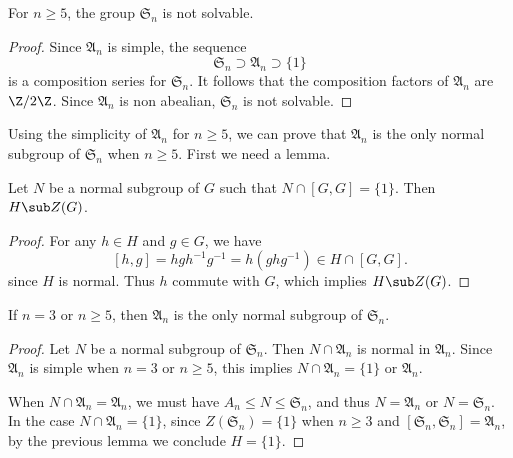 \begin{corollary}
For $n\geq 5$, the group $\mathfrak{S}_n$ is not solvable.
\end{corollary}
\begin{proof}
Since $\mathfrak{A}_n$ is simple, the sequence
\[\mathfrak{S}_n\supset\mathfrak{A}_n\supset\{1\}\]
is a composition series for $\mathfrak{S}_n$. It follows that the composition factors of $\mathfrak{A}_n$ are $\Z/2\Z$. Since $\mathfrak{A}_n$ is non abealian, $\mathfrak{S}_n$ is not solvable.
\end{proof}
Using the simplicity of $\mathfrak{A}_n$ for $n\geq 5$, we can prove that $\mathfrak{A}_n$ is the only normal subgroup of $\mathfrak{S}_n$ when $n\geq 5$. First we need a lemma.
\begin{lemma}
Let $N$ be a normal subgroup of $G$ such that $N\cap[G,G]=\{1\}$. Then $H\sub Z(G)$.
\end{lemma}
\begin{proof}
For any $h\in H$ and $g\in G$, we have
\[[h,g]=hgh^{-1}g^{-1}=h(ghg^{-1})\in H\cap[G,G].\]
since $H$ is normal. Thus $h$ commute with $G$, which implies $H\sub Z(G)$.
\end{proof}
\begin{proposition}
If $n=3$ or $n\geq 5$, then $\mathfrak{A}_n$ is the only normal subgroup of $\mathfrak{S}_n$.
\end{proposition}
\begin{proof}
Let $N$ be a normal subgroup of $\mathfrak{S}_n$. Then $N\cap\mathfrak{A}_n$ is normal in $\mathfrak{A}_n$. Since $\mathfrak{A}_n$ is simple when $n=3$ or $n\geq 5$, this implies $N\cap\mathfrak{A}_n=\{1\}$ or $\mathfrak{A}_n$.\par
When $N\cap\mathfrak{A}_n=\mathfrak{A}_n$, we must have $A_n\leq N\leq\mathfrak{S}_n$, and thus $N=\mathfrak{A}_n$ or $N=\mathfrak{S}_n$. In the case $N\cap\mathfrak{A}_n=\{1\}$, since $Z(\mathfrak{S}_n)=\{1\}$ when $n\geq 3$ and $[\mathfrak{S}_n,\mathfrak{S}_n]=\mathfrak{A}_n$, by the previous lemma we conclude $H=\{1\}$.
\end{proof}
